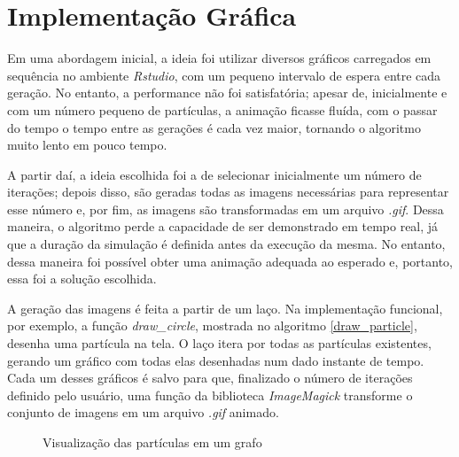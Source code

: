 \documentclass[rel_mlp]{iiufrgs}
\begin{document}
\section{Implementação Gráfica}

    Em uma abordagem inicial, a ideia foi utilizar diversos gráficos carregados em sequência no
    ambiente \textit{Rstudio}, com um pequeno intervalo de espera entre cada geração.
    No entanto, a performance não foi satisfatória; apesar de, inicialmente e com um número
    pequeno de partículas, a animação ficasse fluída, com o passar do tempo o tempo
    entre as gerações é cada vez maior, tornando o algoritmo muito lento em pouco tempo.

    A partir daí, a ideia escolhida foi a de selecionar inicialmente um número de iterações; depois disso, são geradas todas as imagens necessárias para representar esse número e, por fim, as imagens são transformadas em um arquivo \textit{.gif}. Dessa maneira, o algoritmo perde a capacidade de ser demonstrado em tempo real, já que a duração da simulação é definida antes da execução da mesma. No entanto, dessa maneira foi possível obter uma animação adequada ao esperado e, portanto, essa foi a solução escolhida.

    A geração das imagens é feita a partir de um laço. Na implementação funcional, por exemplo,
    a função \textit{draw{\_}circle}, mostrada no algoritmo \ref{draw_particle}, desenha uma partícula na tela.
    O laço itera por todas as partículas existentes, gerando um gráfico com todas elas desenhadas num
    dado instante de tempo. Cada um desses gráficos é salvo para que, finalizado o número de iterações
    definido pelo usuário, uma função da biblioteca \textit{ImageMagick} transforme o conjunto de imagens
    em um arquivo \textit{.gif} animado.

\begin{figure}[htb]
    \centering
    \caption{Visualização das partículas em um grafo}
    \label{fig:particulas.eps}
\end{figure}
\end{document}
